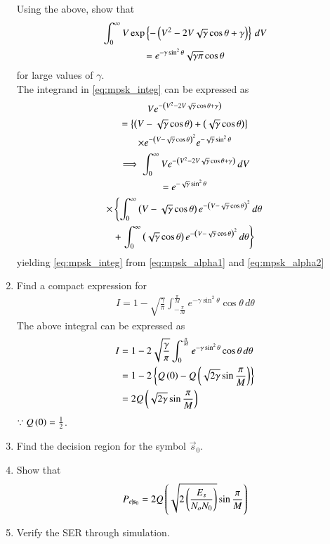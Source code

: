 \documentclass[journal,12pt,twocolumn]{IEEEtran}
\renewcommand\thesection{\arabic{section}}
\begin{document}
\begin{enumerate}[label=\arabic*.,ref=\thesection.\theenumi]
Using the above, show that
%
\begin{multline}
\label{eq:mpsk_integ}
\int_{0}^{\infty}V\exp\left\{-\left(V^2 - 2V \sqrt{\gamma}\cos \theta +\gamma\right)\right\}\,dV
\\
= e^{-\gamma\sin^2 \theta} \sqrt{\gamma\pi}\cos \theta
\end{multline}
%
for large values of $\gamma$.
\\
\solution The integrand in \eqref{eq:mpsk_integ} can be expressed as
\begin{multline}
Ve^{-\left(V^2 - 2V \sqrt{\gamma}\cos \theta +\gamma\right)} 
\\
= \left\{\left(V - \sqrt{\gamma}\cos \theta\right) + \left(\sqrt{\gamma}\cos \theta\right)\right\}
\\
\times e^{-\left(V -  \sqrt{\gamma}\cos \theta \right)^2}e^{-  \sqrt{\gamma}\sin^2 \theta} 
\\
\implies \int_{0}^{\infty}Ve^{-\left(V^2 - 2V \sqrt{\gamma}\cos \theta +\gamma\right)}\,dV
\\
 = e^{-  \sqrt{\gamma}\sin^2 \theta}
\\
\times  \left\{\int_{0}^{\infty}\left(V - \sqrt{\gamma}\cos \theta\right)e^{-\left(V -  \sqrt{\gamma}\cos \theta \right)^2}\,d\theta\right.
\\
+ \left.\int_{0}^{\infty}\left(\sqrt{\gamma}\cos \theta\right)e^{-\left(V -  \sqrt{\gamma}\cos \theta \right)^2}\,d \theta\right\}
\end{multline}
%
yielding \eqref{eq:mpsk_integ} from \eqref{eq:mpsk_alpha1}
and \eqref{eq:mpsk_alpha2}


\item

Find a compact expression for
%
\begin{align}
I = 1 - \sqrt{\frac{\gamma}{\pi}}\int_{-\frac{\pi}{M}}^{\frac{\pi}{M}}e^{- \gamma\sin^2\theta }\cos \theta\, d\theta
\end{align}
\solution The above integral can be expressed as
%
\begin{align}
I &= 1 - 2\sqrt{\frac{\gamma}{\pi}}\int_{0}^{\frac{\pi}{M}}e^{- \gamma\sin^2\theta }\cos \theta\, d\theta
\\
&= 1 - 2 \left\{Q\left(0\right)-Q\left(\sqrt{2\gamma}\sin \frac{\pi}{M}\right)\right\}
\\
&= 2Q\left(\sqrt{2\gamma}\sin \frac{\pi}{M}\right)
\end{align}
$\because Q\left(0\right) = \frac{1}{2}$.
\item Find the decision region for the symbol $\vec{s}_0$.

\item

Show that
\begin{equation}
P_{e|\mathbf{s}_0}=2Q\left(\sqrt{2\left(\frac{{E_s}}{N_oN_0}\right)}\sin \frac{\pi}{M}\right)
\end{equation}
\item

Verify the SER through simulation.
\end{enumerate}
%
\end{document}
